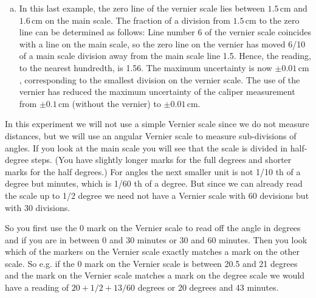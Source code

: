 \begin{enumerate}[a)]
\item In this last example, the zero line of the vernier scale lies between $1.5\,\mathrm{cm}$ and $1.6\,\mathrm{cm}$ on the main scale. The fraction of a division from $1.5\,\mathrm{cm}$ to the zero line can be determined as follows: Line number 6 of the vernier scale coincides with a line on the main scale, so the zero line on the vernier has moved 6/10 of a main scale division away from the main scale line 1.5. Hence, the reading, to the nearest hundredth, is 1.56. The maximum uncertainty is now $\pm 0.01\,\mathrm{cm}$, corresponding to the smallest division on the vernier scale. The use of the vernier has reduced the maximum uncertainty of the caliper measurement from $\pm 0.1\,\mathrm{cm}$ (without the vernier) to $\pm 0.01\,\mathrm{cm}$.
\end{enumerate}

In this experiment we will not use a simple Vernier scale since we do not measure distances, but we will use an angular Vernier scale to measure sub-divisions of angles. If you look at the main scale you will see that the scale is divided in half-degree steps. (You have slightly longer marks for the full degrees and shorter marks for the half degrees.) For angles the next smaller unit is not 1/10 th of a degree but minutes, which is 1/60 th of a degree. But since we can already read the scale up to 1/2 degree we need not have a Vernier scale with 60 devisions but with 30 divisions.\myskip

So you first use the 0 mark on the Vernier scale to read off the angle in degrees and if you are in between 0 and 30 minutes or 30 and 60 minutes. Then you look which of the markers on the Vernier scale exactly matches a mark on the other scale. So e.g. if the 0 mark on the Vernier scale is between 20.5 and 21 degrees and the  mark on the Vernier scale matches a mark on the degree scale we would have a reading of $20 + 1/2+ 13/60$ degrees or 20 degrees and 43 minutes.

